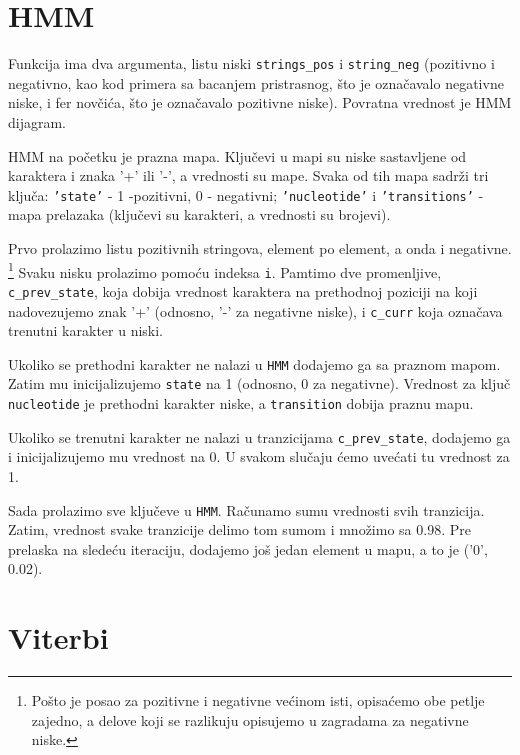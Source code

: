 \section{HMM}

Funkcija ima dva argumenta, listu niski \texttt{strings\_pos} i \texttt{string\_neg} (pozitivno i negativno, kao kod primera sa bacanjem pristrasnog, što je označavalo negativne niske, i fer novčića, što je označavalo pozitivne niske). Povratna vrednost je HMM dijagram.

HMM na početku je prazna mapa. Ključevi u mapi su niske sastavljene od karaktera i znaka '+' ili '-', a vrednosti su mape. Svaka od tih mapa sadrži tri ključa: \texttt{'state'} - 1 -pozitivni, 0 - negativni; \texttt{'nucleotide'} i \texttt{'transitions'} - mapa prelazaka (ključevi su karakteri, a vrednosti su brojevi).

Prvo prolazimo listu pozitivnih stringova, element po element, a onda i negativne. \footnote{Pošto je posao za pozitivne i negativne većinom isti, opisaćemo obe petlje zajedno, a delove koji se razlikuju opisujemo u zagradama za negativne niske.} Svaku nisku prolazimo pomoću indeksa \texttt{i}. Pamtimo dve promenljive, \texttt{c\_prev\_state}, koja dobija vrednost karaktera na prethodnoj poziciji na koji nadovezujemo znak '+' (odnosno, '-' za negativne niske), i \texttt{c\_curr} koja označava trenutni karakter u niski.

Ukoliko se prethodni karakter ne nalazi u \texttt{HMM} dodajemo ga sa praznom mapom. Zatim mu inicijalizujemo \texttt{state} na 1 (odnosno, 0 za negativne). Vrednost za ključ \texttt{nucleotide} je prethodni karakter niske, a \texttt{transition} dobija praznu mapu.

Ukoliko se trenutni karakter ne nalazi u tranzicijama \texttt{c\_prev\_state}, dodajemo ga i inicijalizujemo mu vrednost na 0. U svakom slučaju ćemo uvećati tu vrednost za 1.

Sada prolazimo sve ključeve u \texttt{HMM}. Računamo sumu vrednosti svih tranzicija. Zatim, vrednost svake tranzicije delimo tom sumom i množimo sa 0.98. Pre prelaska na sledeću iteraciju, dodajemo još jedan element u mapu, a to je ('0', 0.02).





\section{Viterbi}


